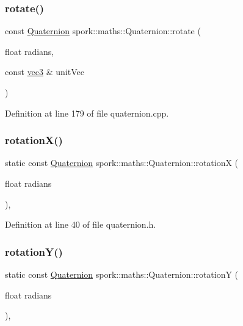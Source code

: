 \subsubsection{\texorpdfstring{rotate()}{rotate()}\hspace{0.1cm}{\footnotesize\ttfamily [3/3]}}
{\footnotesize\ttfamily const \hyperlink{structspork_1_1maths_1_1_quaternion}{Quaternion} spork\+::maths\+::\+Quaternion\+::rotate (\begin{DoxyParamCaption}\item[{float}]{radians,  }\item[{const \hyperlink{structspork_1_1maths_1_1vec3}{vec3} \&}]{unit\+Vec }\end{DoxyParamCaption})\hspace{0.3cm}{\ttfamily [static]}}



Definition at line 179 of file quaternion.\+cpp.

\mbox{\label{structspork_1_1maths_1_1_quaternion_ab9d8fd8220c2f355b675a7ed2cdaee68}} 
\subsubsection{\texorpdfstring{rotation\+X()}{rotationX()}}
{\footnotesize\ttfamily static const \hyperlink{structspork_1_1maths_1_1_quaternion}{Quaternion} spork\+::maths\+::\+Quaternion\+::rotationX (\begin{DoxyParamCaption}\item[{float}]{radians }\end{DoxyParamCaption})\hspace{0.3cm}{\ttfamily [inline]}, {\ttfamily [static]}}



Definition at line 40 of file quaternion.\+h.

\mbox{\label{structspork_1_1maths_1_1_quaternion_a6e59b5c395cb7fdfaa902d4fb204d0c3}} 
\subsubsection{\texorpdfstring{rotation\+Y()}{rotationY()}}
{\footnotesize\ttfamily static const \hyperlink{structspork_1_1maths_1_1_quaternion}{Quaternion} spork\+::maths\+::\+Quaternion\+::rotationY (\begin{DoxyParamCaption}\item[{float}]{radians }\end{DoxyParamCaption})\hspace{0.3cm}{\ttfamily [inline]}, {\ttfamily [static]}}




